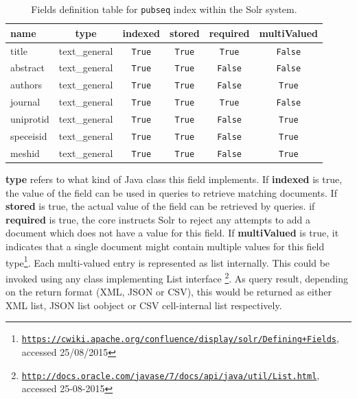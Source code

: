 \begin{table}[htbp]
\caption{Fields definition table for \texttt{pubseq} index within the Solr system.}
\centering
\begin{tabular}{| l | c | c | c | c | c |}
  \hline
  name & type & indexed & stored & required & multiValued \\
  \hline
  \hline
  title & text\_general & \texttt{True} & \texttt{True} & \texttt{True} & \texttt{False} \\
  \hline
  abstract & text\_general & \texttt{True} & \texttt{True} & \texttt{False} & \texttt{False} \\
  \hline
  authors & text\_general & \texttt{True} & \texttt{True} & \texttt{False} & \texttt{True} \\
  \hline
  journal & text\_general & \texttt{True} & \texttt{True} & \texttt{True} & \texttt{False} \\
  \hline
  uniprotid & text\_general & \texttt{True} & \texttt{True} & \texttt{False} & \texttt{True} \\
  \hline
  speceisid & text\_general & \texttt{True} & \texttt{True} & \texttt{False} & \texttt{True} \\
  \hline
  meshid & text\_general & \texttt{True} & \texttt{True} & \texttt{False} & \texttt{True} \\
  \hline
\end{tabular}
  \label{fig:FieldsDefSolr}
\end{table}

\textbf{type} refers to what kind of Java class this field implements. If \textbf{indexed} is true, the value of the field can be used in queries to retrieve matching documents. If \textbf{stored} is true, the actual value of the field can be retrieved by queries. if \textbf{required} is true, the core instructs Solr to reject any attempts to add a document which does not have a value for this field. If \textbf{multiValued} is true, it indicates that a single document might contain multiple values for this field type\footnote{\href{https://cwiki.apache.org/confluence/display/solr/Defining+Fields}{\texttt{https://cwiki.apache.org/confluence/display/solr/Defining+Fields}}, accessed 25/08/2015}. Each multi-valued entry is represented as list internally. This could be invoked using any class implementing List interface \footnote{\href{http://docs.oracle.com/javase/7/docs/api/java/util/List.html}{\texttt{http://docs.oracle.com/javase/7/docs/api/java/util/List.html}}, accessed 25-08-2015}. As query result, depending on the return format (XML, JSON or CSV), this would be returned as either XML list, JSON list oobject or CSV cell-internal list respectively.

